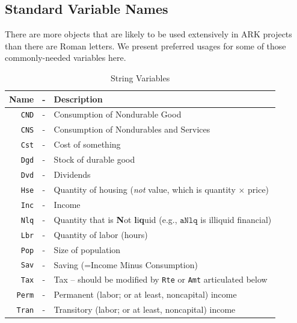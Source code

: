 \documentclass{econark}
\begin{document}
\subsection{Standard Variable Names}

There are more objects that are likely to be used extensively in ARK projects than there are Roman letters.  We present preferred usages for some of those commonly-needed variables here.

\hypertarget{Standard-Variable-Names}{}
\begin{table}[ht]
  \centering
  \begin{tabular}{|rcl|}
    Name & - & Description
    \\ \hline
    \texttt{CND}    & - & Consumption of Nondurable Good
    \\   \texttt{CNS}    & - & Consumption of Nondurables and Services
    \\  \texttt{Cst}    & - & Cost of something
    \\  \texttt{Dgd}    & - & Stock of durable good
    \\  \texttt{Dvd}    & - & Dividends
    \\  \texttt{Hse}    & - & Quantity of housing (\textit{not} value, which is quantity $\times$ price)
    \\  \texttt{Inc}    & - & Income
    \\  \texttt{Nlq}    & - & Quantity that is \textbf{N}ot \textbf{l}i\textbf{q}uid (e.g., $\mathtt{aNlq}$ is illiquid financial)
    \\  \texttt{Lbr}    & - & Quantity of labor (hours)
    \\  \texttt{Pop}    & - & Size of population
    \\  \texttt{Sav}    & - & Saving (=Income Minus Consumption)
    \\  \texttt{Tax}    & - & Tax -- should be modified by \texttt{Rte} or \texttt{Amt} articulated below
    \\  \texttt{Perm}   & - & Permanent (labor; or at least, noncapital) income
    \\  \texttt{Tran}   & - & Transitory (labor; or at least, noncapital) income
    \\ \hline
  \end{tabular}
  \caption{String Variables}
  \label{table:Standard-Variable-Names}
\end{table}
\end{document}
